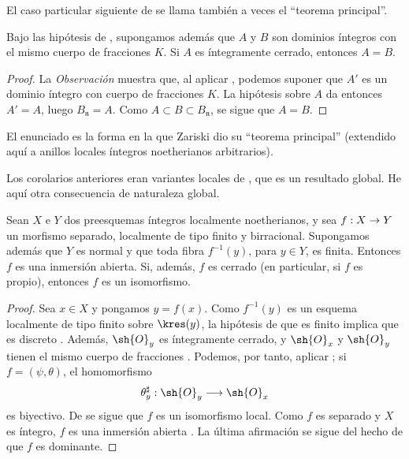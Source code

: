 \documentclass[oneside]{amsart}
\makeatletter
\newcommand{\ega@arrow}[2]{\mathchoice{#1}{#2}{#2}{#2}}
\renewcommand{\to}{\ega@arrow{\longrightarrow}{\rightarrow}}
\let\EGAOriginalLabel\label
\renewcommand{\label}[1]{\phantomsection\EGAOriginalLabel{#1}}
\makeatother
\begin{document}
El caso particular siguiente de  se llama también a
veces el ``teorema principal''.

\begin{corollary}[4.4.8]
\label{III.4.4.8}
Bajo las hipótesis de , supongamos además que $A$ y
$B$ son dominios íntegros con el mismo cuerpo de fracciones $K$.
Si $A$ es íntegramente cerrado, entonces $A=B$.
\end{corollary}

\begin{proof}
La \emph{Observación}  muestra que, al aplicar
, podemos suponer que $A'$ es un dominio íntegro con
cuerpo de fracciones $K$. La hipótesis sobre $A$ da entonces
$A'=A$, luego $B_{\mathfrak n}=A$. Como
$A\subset B\subset B_{\mathfrak n}$, se sigue que $A=B$.
\end{proof}

El enunciado  es la forma en la que Zariski dio su
``teorema principal'' (extendido aquí a anillos locales íntegros
noetherianos arbitrarios).

Los corolarios anteriores eran variantes locales de
, que es un resultado global. He aquí otra
consecuencia de naturaleza global.

\begin{corollary}[4.4.9]
\label{III.4.4.9}
Sean $X$ e $Y$ dos preesquemas íntegros localmente noetherianos, y sea
$f:X\to Y$ un morfismo separado, localmente de tipo finito y birracional.
Supongamos además que $Y$ es normal y que toda fibra $f^{-1}(y)$,
para $y\in Y$, es finita. Entonces $f$ es una inmersión abierta. Si,
además, $f$ es cerrado (en particular, si $f$ es propio), entonces
$f$ es un isomorfismo.
\end{corollary}

\begin{proof}
Sea $x\in X$ y pongamos $y=f(x)$. Como $f^{-1}(y)$ es un esquema
localmente de tipo finito sobre $\kres(y)$, la hipótesis de que es finito implica que
es discreto . Además, $\sh{O}_y$ es íntegramente
cerrado, y $\sh{O}_x$ y $\sh{O}_y$ tienen el mismo cuerpo de fracciones
. Podemos, por tanto, aplicar
; si $f=(\psi,\theta)$, el homomorfismo
\[
  \theta_y^\sharp:\sh{O}_y\longrightarrow\sh{O}_x
\]
es biyectivo. De  se sigue que $f$ es un isomorfismo
local. Como $f$ es separado y $X$ es íntegro, $f$ es una inmersión
abierta . La última afirmación se sigue del hecho de
que $f$ es dominante.
\end{proof}
\end{document}

